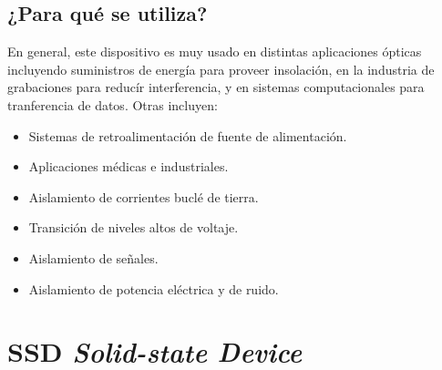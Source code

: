\documentclass[letterpaper, 12pt]{article}
\begin{document}
\begin{justify}
        \subsection{¿Para qué se utiliza?}
        En general, este dispositivo es muy usado en distintas aplicaciones ópticas incluyendo suministros de energía para proveer insolación, en la industria de grabaciones para reducír interferencia, y en sistemas computacionales
        para tranferencia de datos. Otras incluyen:
        \begin{itemize}
            \item Sistemas de retroalimentación de fuente de alimentación.
            \item Aplicaciones médicas e industriales.
            \item Aislamiento de corrientes buclé de tierra.
            \item Transición de niveles altos de voltaje.
            \item Aislamiento de señales.
            \item Aislamiento de potencia eléctrica y de ruido.
        \end{itemize}

        \section{SSD \emph{Solid-state Device}}

\end{justify}
\end{document}
